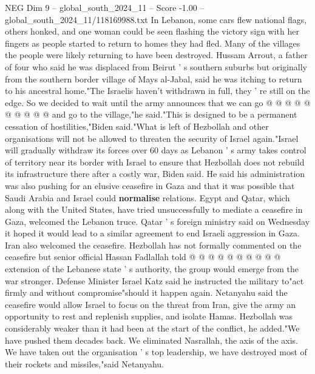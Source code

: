 \begin{textsample}{NEG Dim 9 – global\_south\_2024\_11 – Score -1.00 – global\_south\_2024\_11/118169988.txt}
In Lebanon, some cars flew national flags, others honked, and one woman could be seen flashing the victory sign with her fingers as people started to return to homes they had fled.
Many of the villages the people were likely returning to have been destroyed.
Hussam Arrout, a father of four who said he was displaced from Beirut ' s southern suburbs but originally from the southern border village of Mays al-Jabal, said he was itching to return to his ancestral home."The Israelis haven't withdrawn in full, they ' re still on the edge.
So we decided to wait until the army announces that we can go @ @ @ @ @ @ @ @ @ @ and go to the village,"he said."This is designed to be a permanent cessation of hostilities,"Biden said."What is left of Hezbollah and other organisations will not be allowed to threaten the security of Israel again."Israel will gradually withdraw its forces over 60 days as Lebanon ' s army takes control of territory near its border with Israel to ensure that Hezbollah does not rebuild its infrastructure there after a costly war, Biden said.
He said his administration was also pushing for an elusive ceasefire in Gaza and that it was possible that Saudi Arabia and Israel could \textbf{normalise} relations.
Egypt and Qatar, which along with the United States, have tried unsuccessfully to mediate a ceasefire in Gaza, welcomed the Lebanon truce.
Qatar ' s foreign ministry said on Wednesday it hoped it would lead to a similar agreement to end Israeli aggression in Gaza.
Iran also welcomed the ceasefire.
Hezbollah has not formally commented on the ceasefire but senior official Hassan Fadlallah told @ @ @ @ @ @ @ @ @ @ extension of the Lebanese state ' s authority, the group would emerge from the war stronger.
Defense Minister Israel Katz said he instructed the military to"act firmly and without compromise"should it happen again.
Netanyahu said the ceasefire would allow Israel to focus on the threat from Iran, give the army an opportunity to rest and replenish supplies, and isolate Hamas.
Hezbollah was considerably weaker than it had been at the start of the conflict, he added."We have pushed them decades back.
We eliminated Nasrallah, the axis of the axis.
We have taken out the organisation ' s top leadership, we have destroyed most of their rockets and missiles,"said Netanyahu.

\end{textsample}
